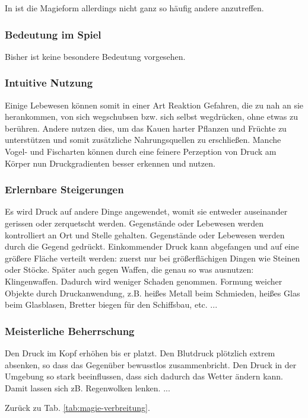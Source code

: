 In  ist die Magieform allerdings nicht ganz so häufig andere anzutreffen. 

\subsubsection{Bedeutung im Spiel}
Bisher ist keine besondere Bedeutung vorgesehen.

\subsubsection{Intuitive Nutzung}
Einige Lebewesen können somit in einer Art Reaktion Gefahren, die zu nah an sie herankommen, von sich wegschubsen bzw. sich selbst wegdrücken, ohne etwas zu berühren. 
Andere nutzen dies, um das Kauen harter Pflanzen und Früchte zu unterstützen und somit zusätzliche Nahrungsquellen zu erschließen.
Manche Vogel- und Fischarten können durch eine feinere Perzeption von Druck am Körper nun Druckgradienten besser erkennen und nutzen.

\subsubsection{Erlernbare Steigerungen}
\begin{outline}
	\1 Es wird Druck auf andere Dinge angewendet, womit sie entweder auseinander gerissen oder zerquetscht werden.
	\1 Gegenstände oder Lebewesen werden kontrolliert an Ort und Stelle gehalten.
	\1 Gegenstände oder Lebewesen werden durch die Gegend gedrückt.
	\1 Einkommender Druck kann abgefangen und auf eine größere Fläche verteilt werden: zuerst nur bei größerflächigen Dingen wie Steinen oder Stöcke. 
	Später auch gegen Waffen, die genau so was ausnutzen: Klingenwaffen. 
	Dadurch wird weniger Schaden genommen.
	\1 Formung weicher Objekte durch Druckanwendung, z.B. heißes Metall beim Schmieden, heißes Glas beim Glasblasen, Bretter biegen für den Schiffsbau, etc.
	\1 ...
\end{outline}

\subsubsection{Meisterliche Beherrschung} 
\begin{outline}
	\1 Den Druck im Kopf erhöhen bis er platzt.
	\1 Den Blutdruck plötzlich extrem absenken, so dass das Gegenüber bewusstlos zusammenbricht. 
	\1 Den Druck in der Umgebung so stark beeinflussen, dass sich dadurch das Wetter ändern kann. 
	Damit lassen sich zB. Regenwolken lenken.
	\1 ...
\end{outline}
Zurück zu Tab. \ref{tab:magie-verbreitung}.



